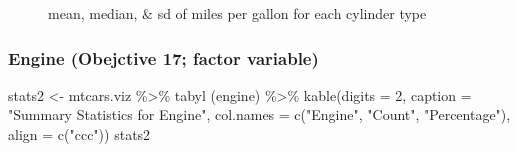 \documentclass[
  man,
  floatsintext,
  longtable,
  nolmodern,
  notxfonts,
  notimes,
  colorlinks=true,linkcolor=blue,citecolor=blue,urlcolor=blue]{apa7}
\newenvironment{Shaded}{\begin{snugshade}}{\end{snugshade}}
\newcommand{\AttributeTok}[1]{\textcolor[rgb]{0.40,0.45,0.13}{#1}}
\newcommand{\DecValTok}[1]{\textcolor[rgb]{0.68,0.00,0.00}{#1}}
\newcommand{\FunctionTok}[1]{\textcolor[rgb]{0.28,0.35,0.67}{#1}}
\newcommand{\NormalTok}[1]{\textcolor[rgb]{0.00,0.23,0.31}{#1}}
\newcommand{\OtherTok}[1]{\textcolor[rgb]{0.00,0.23,0.31}{#1}}
\newcommand{\SpecialCharTok}[1]{\textcolor[rgb]{0.37,0.37,0.37}{#1}}
\newcommand{\StringTok}[1]{\textcolor[rgb]{0.13,0.47,0.30}{#1}}
\begin{document}
\begin{figure}[H]

\caption{\label{fig-mean-median-sd-of-mpg-for-each-cylinder-type}mean,
median, \& sd of miles per gallon for each cylinder type}


\end{figure}%

\subsubsection{Engine (Obejctive 17; factor
variable)}\label{engine-obejctive-17-factor-variable}

\begin{Shaded}
\begin{Highlighting}[]
\NormalTok{stats2 }\OtherTok{\textless{}{-}}\NormalTok{ mtcars.viz }\SpecialCharTok{\%\textgreater{}\%} \FunctionTok{tabyl}\NormalTok{ (engine) }\SpecialCharTok{\%\textgreater{}\%}
  \FunctionTok{kable}\NormalTok{(}\AttributeTok{digits =} \DecValTok{2}\NormalTok{, }
        \AttributeTok{caption =} \StringTok{"Summary Statistics for Engine"}\NormalTok{,}
        \AttributeTok{col.names =} \FunctionTok{c}\NormalTok{(}\StringTok{"Engine"}\NormalTok{, }\StringTok{"Count"}\NormalTok{, }\StringTok{"Percentage"}\NormalTok{),}
        \AttributeTok{align =} \FunctionTok{c}\NormalTok{(}\StringTok{"ccc"}\NormalTok{))}
\NormalTok{stats2}
\end{Highlighting}
\end{Shaded}
\end{document}
